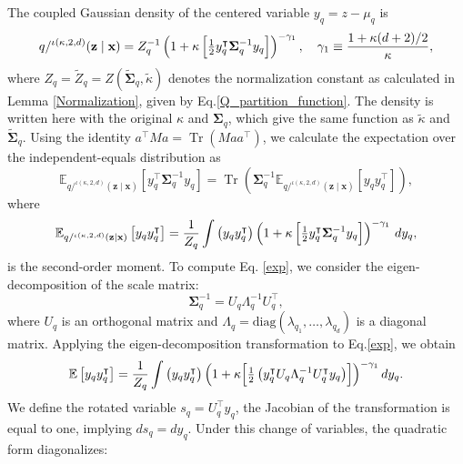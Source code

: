 \documentclass[twoside,11pt]{article}
\renewenvironment{proof}{\par\noindent{\bf Proof\ }}{\hfill\BlackBox\par\vspace{2mm}}
\begin{document}
\begin{proof}
The coupled Gaussian density of the centered variable $y_q = z-\mu_q$ is
\[
q/^{\iota(\kappa,2,d)}(\textbf{z}\mid \textbf{x})
=
Z_q^{-1}
\left(
1 + \kappa\, \Bigl[\tfrac{1}{2}y_q^\intercal \boldsymbol{\Sigma}_q^{-1} y_q\Bigr]
\right)^{-\gamma_1},
\quad
\gamma_1 \equiv \frac{1+\kappa(d+2)/2}{\kappa},
\]
where $Z_q = \tilde{Z}_q = Z(\widetilde{\boldsymbol{\Sigma}}_q,\tilde\kappa)$ denotes the normalization constant as calculated in Lemma \ref{Normalization}, given by Eq.\eqref{Q_partition_function}. The density is written here with the original $\kappa$ and $\boldsymbol{\Sigma}_q$, which give the same function as $\tilde\kappa$ and $\widetilde{\boldsymbol{\Sigma}}_q$. Using the identity $a^\intercal M a = \operatorname{Tr}(M a a^\intercal)$,
we calculate the expectation over the independent-equals distribution as
\begin{equation} \label{1th_stamente,lemma2}
    \mathbb{E}_{q/^{\iota(\kappa,2,d)}(\textbf{z}\mid \textbf{x})}\!\left[y_q^\intercal \boldsymbol{\Sigma}_q^{-1} y_q\right]
=
\operatorname{Tr}
\!\left(
\boldsymbol{\Sigma}_q^{-1}\mathbb{E}_{q/^{\iota(\kappa,2,d)}(\textbf{z}\mid \textbf{x})}[y_q y_q^\intercal]
\right),    
\end{equation}
where 
\begin{align}\label{exp}
\mathbb{E}_{q/^{\iota(\kappa,2,d)}(\textbf{z}\mid \textbf{x})}\left[y_qy_q^{\intercal}\right]
=
\frac{1}{Z_q}
\int
\left(y_q y_q^{\intercal}\right)
\left(
1+\kappa\, \Bigl[\tfrac{1}{2}y_q^{\intercal}\boldsymbol{\Sigma}_q^{-1}y_q\Bigr]
\right)^{-\gamma_1}
\,dy_q,
\end{align}
is the second-order moment. To compute Eq. \eqref{exp}, we consider the eigen-decomposition of the scale matrix:
\[
\boldsymbol{\Sigma}_q^{-1} = U_q \Lambda_q^{-1} U_q^\intercal,
\]
where $U_q$ is an orthogonal matrix and $\Lambda_q=\mathrm{diag}(\lambda_{q_1},\dots,\lambda_{q_d})$ is a diagonal matrix. Applying the eigen-decomposition transformation to Eq.\eqref{exp}, we obtain
\begin{align} \label{exp2}
\mathbb{E}\left[y_qy_q^{\intercal}\right]=\frac{1}{Z_q}\int\left(y_q y^\intercal_q\right)\left(1+\kappa\Bigl[\tfrac{1}{2}\left( y_q^{\intercal}U_q\Lambda_q^{-1}U_q^{\intercal}y_q\right)\Bigr]\right)^{-\gamma_1} dy_q.
\end{align}
We define the rotated variable $s_q = U_q^\intercal y_q$, %
the Jacobian of the transformation is equal to one, implying $ds_q = dy_q$. Under this change of variables, the quadratic form diagonalizes:

\end{proof}
\end{document}
